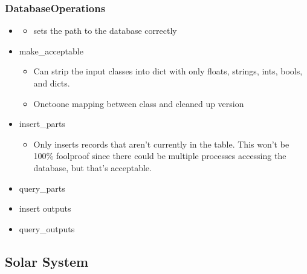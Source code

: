 \documentclass[letterpaper,10pt,english]{sphinxmanual}
\begin{document}
\subsubsection{DatabaseOperations}
\label{\detokenize{nexoclom2/TestCases:databaseoperations}}\begin{itemize}
\item {} 
\sphinxAtStartPar
{}
\begin{itemize}
\item {} 
\sphinxAtStartPar
sets the path to the database correctly

\end{itemize}

\item {} 
\sphinxAtStartPar
make\_acceptable
\begin{itemize}
\item {} 
\sphinxAtStartPar
Can strip the input classes into dict with only floats, strings, ints,
bools, and dicts.

\item {} 
\sphinxAtStartPar
One\sphinxhyphen{}to\sphinxhyphen{}one mapping between class and cleaned up version

\end{itemize}

\item {} 
\sphinxAtStartPar
insert\_parts
\begin{itemize}
\item {} 
\sphinxAtStartPar
Only inserts records that aren’t currently in the table. This won’t be
100\% foolproof since there could be multiple processes accessing the
database, but that’s acceptable.

\end{itemize}

\item {} 
\sphinxAtStartPar
query\_parts

\item {} 
\sphinxAtStartPar
insert outputs

\item {} 
\sphinxAtStartPar
query\_outputs

\end{itemize}


\subsection{Solar System}
\label{\detokenize{nexoclom2/TestCases:solar-system}}
\end{document}
